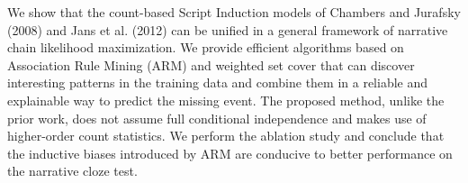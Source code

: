We show that the count-based Script Induction models of Chambers and Jurafsky (2008) and Jans et al. (2012) can be unified in a general framework of narrative chain likelihood maximization. We provide efficient algorithms based on Association Rule Mining (ARM) and weighted set cover that can discover interesting patterns in the training data and combine them in a reliable and explainable way to predict the missing event. The proposed method, unlike the prior work, does not assume full conditional independence and makes use of higher-order count statistics. We perform the ablation study and conclude that the inductive biases introduced by ARM are conducive to better performance on the narrative cloze test.
